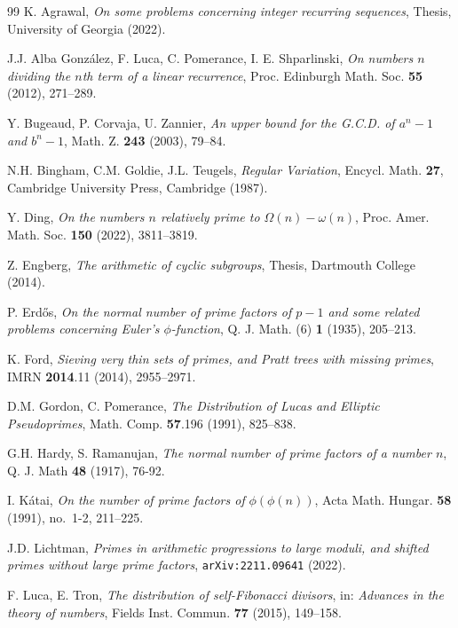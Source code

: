 \documentclass[12pt,a4paper,oneside]{amsart}
\begin{document}
\begin{thebibliography}{99}
 K. Agrawal, \textit{On some problems concerning integer recurring sequences}, Thesis, University of Georgia (2022).

 J.J. Alba Gonz\'{a}lez, F. Luca, C. Pomerance, I. E. Shparlinski, \textit{On numbers $n$ dividing the $n$th term of a linear recurrence}, Proc. Edinburgh Math. Soc. \textbf{55} (2012), 271--289. 

 Y. Bugeaud, P. Corvaja, U. Zannier, \textit{An upper bound for the G.C.D. of $a^n-1$ and $b^n-1$}, Math. Z. \textbf{243} (2003), 79--84.

 N.H. Bingham, C.M. Goldie, J.L. Teugels, \textit{Regular Variation}, Encycl. Math. \textbf{27}, Cambridge University Press, Cambridge (1987).

Y. Ding, \textit{On the numbers $n$ relatively prime to $\Omega(n)-\omega(n)$}, Proc. Amer. Math. Soc. \textbf{150} (2022), 3811--3819. 

 Z. Engberg, \textit{The arithmetic of cyclic subgroups}, Thesis, Dartmouth College (2014).

 P. Erdős, \textit{On the normal number of prime factors of $p-1$ and some related problems concerning Euler's $\phi$-function}, Q. J. Math. (6) \textbf{1} (1935), 205--213.

 K. Ford, \textit{Sieving very thin sets of primes, and Pratt trees with missing primes}, IMRN \textbf{2014}.11 (2014), 2955--2971.

 D.M. Gordon, C. Pomerance, \textit{The Distribution of Lucas and Elliptic Pseudoprimes}, Math. Comp. \textbf{57}.196 (1991), 825--838.

 G.H. Hardy, S. Ramanujan, \textit{The normal number of prime factors of a number $n$}, Q. J. Math \textbf{48} (1917), 76-92. 

 I. K\'atai, \textit{On the number of prime factors of} $\phi(\phi(n))$, Acta Math. Hungar. {\bf 58} (1991), no.~1-2, 211--225.


 J.D. Lichtman, \textit{Primes in arithmetic progressions to large moduli, and shifted primes without large prime factors}, \texttt{arXiv:2211.09641} (2022).

 F. Luca, E. Tron, \textit{The distribution of self-Fibonacci divisors}, in: \textit{Advances in the theory of numbers}, Fields Inst. Commun. \textbf{77} (2015), 149--158.


\end{thebibliography}
\end{document}
